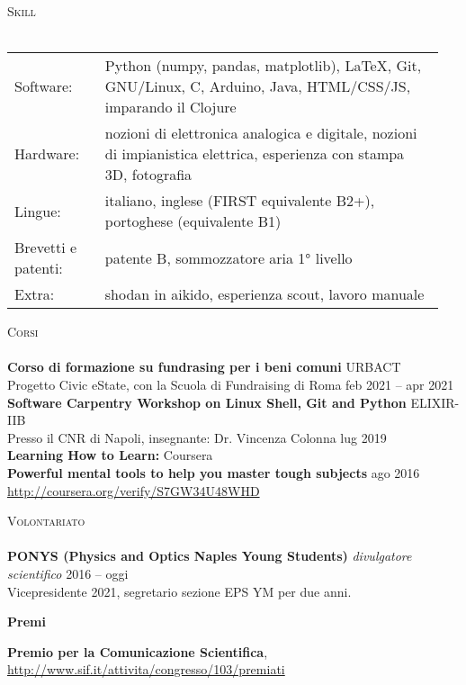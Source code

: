 \documentclass[a4paper]{article}
\newcommand{\lineunder} {
  \vspace*{-8pt} \\
  \hspace*{-18pt} \hrulefill \\
}
\newcommand{\header} [1] {
  {\hspace*{-18pt}\vspace*{6pt} \textsc{#1}}
  \vspace*{-6pt} \lineunder
}
\begin{document}
\header{Skill}
\begin{tabular}{ p{0.2\linewidth} p{0.75\linewidth} }
  Software: & Python (numpy, pandas, matplotlib), LaTeX, Git, GNU/Linux,
              C, Arduino, Java, HTML/CSS/JS, imparando il Clojure \\
  Hardware: & nozioni di elettronica analogica e digitale,
              nozioni di impianistica elettrica,
              esperienza con stampa 3D, fotografia \\
  Lingue: & italiano, inglese (FIRST equivalente B2+),
            portoghese (equivalente B1) \\
  Brevetti e patenti: & patente B, sommozzatore aria 1° livello \\
  Extra: & shodan in aikido, esperienza scout, lavoro manuale
\end{tabular}
\vspace{2mm}

\header{Corsi}
\textbf{Corso di formazione su fundrasing per i beni comuni} \hfill URBACT \\
Progetto Civic eState, con la Scuola di Fundraising di Roma \hfill feb 2021 -- apr 2021\\
\vspace*{2mm}
\textbf{Software Carpentry Workshop on Linux Shell, Git and Python} \hfill ELIXIR-IIB\\
Presso il CNR di Napoli, insegnante: Dr. Vincenza Colonna \hfill lug 2019\\
\vspace*{2mm}
\textbf{Learning How to Learn:} \hfill Coursera\\
\textbf{Powerful mental tools to help you master tough subjects} \hfill ago 2016\\
\url{http://coursera.org/verify/S7GW34U48WHD}\\
\vspace*{2mm}

\header{Volontariato}
\textbf{PONYS (Physics and Optics Naples Young Students)}
{\sl divulgatore scientifico} \hfill 2016 -- oggi\\
\vspace{2mm}
Vicepresidente 2021, segretario sezione EPS YM per due anni.

\vspace{2mm}

\textbf{Premi}

\begin{description} \itemsep 1pt
  \item [2017] \textbf{Premio per la Comunicazione Scientifica},
        \url{http://www.sif.it/attivita/congresso/103/premiati}
\end{description}
\end{document}
